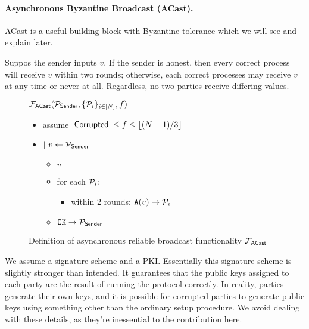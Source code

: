 \paragraph{Asynchronous Byzantine Broadcast (ACast).}
ACast is a useful building block with Byzantine tolerance which we will see and explain later.

Suppos the sender inputs $v$. If the sender is honest, then every correct process will receive $v$ within two rounds; otherwise, each correct processes may receive $v$ at any time or never at all. Regardless, no two parties receive differing values.

\begin{figure}[h!]
  \begin{boxedminipage}{\columnwidth}
    \begin{centering}
      \textbf{$\F{ACast}(\P_{\msf{Sender}}, {\Ps},f)$} \\
    \end{centering}
    \small
    \begin{itemize}[leftmargin=2mm]
    \item[] assume $|\msf{Corrupted}| \le f \le \lfloor (N-1)/3 \rfloor$
    \item[] $|~ v \leftarrow \P_\msf{Sender}$
      \begin{itemize}[leftmargin=3mm]
      \item[]  $v$
      \item[] for each $\P_i$:
        \begin{itemize}[leftmargin=4mm]
        \item[] within $2$ rounds: $\mtt{A}(v) \rightarrow \P_i$
        \end{itemize}
        \item[] $\mtt{OK} \rightarrow \P_\msf{Sender}$
      \end{itemize}
    \end{itemize}
  \end{boxedminipage}
  \caption{
    \label{fig:f_acast}
    Definition of asynchronous reliable broadcast functionality $\F{ACast}$}
\end{figure}


We assume a signature scheme and a PKI. 
Essentially this signature scheme is slightly stronger than intended. It guarantees that the public keys assigned to each party are the result of running the protocol correctly. In reality, parties generate their own keys, and it is possible for corrupted parties to generate public keys using something other than the ordinary setup procedure. We avoid dealing with these details, as they're inessential to the contribution here. 

